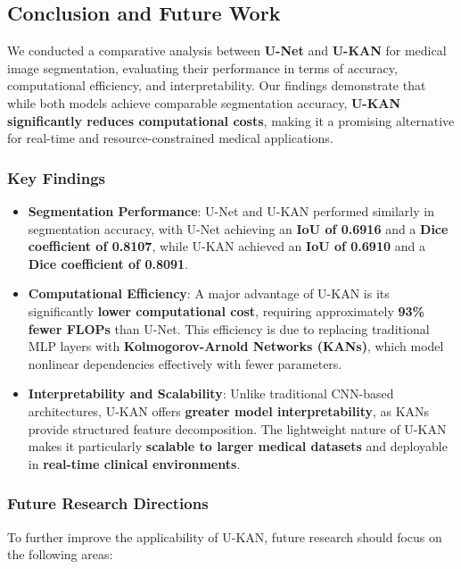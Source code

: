 \documentclass[conference]{IEEEtran}
\begin{document}
\subsection{Conclusion and Future Work}

We conducted a comparative analysis between \textbf{U-Net} and \textbf{U-KAN}
for medical image segmentation, evaluating their performance in terms of
accuracy, computational efficiency, and interpretability. Our findings
demonstrate that while both models achieve comparable segmentation accuracy,
\textbf{U-KAN significantly reduces computational costs}, making it a promising
alternative for real-time and resource-constrained medical applications.

\subsubsection{Key Findings}

\begin{itemize}
    \item \textbf{Segmentation Performance}: U-Net and U-KAN performed similarly in segmentation accuracy, with U-Net achieving an \textbf{IoU of 0.6916} and a \textbf{Dice coefficient of 0.8107}, while U-KAN achieved an \textbf{IoU of 0.6910} and a \textbf{Dice coefficient of 0.8091}.

    \item \textbf{Computational Efficiency}: A major advantage of U-KAN is its significantly \textbf{lower computational cost}, requiring approximately \textbf{93\% fewer FLOPs} than U-Net. This efficiency is due to replacing traditional MLP layers with \textbf{Kolmogorov-Arnold Networks (KANs)}, which model nonlinear dependencies effectively with fewer parameters.

    \item \textbf{Interpretability and Scalability}: Unlike traditional CNN-based architectures, U-KAN offers \textbf{greater model interpretability}, as KANs provide structured feature decomposition. The lightweight nature of U-KAN makes it particularly \textbf{scalable to larger medical datasets} and deployable in \textbf{real-time clinical environments}.
\end{itemize}

\subsubsection{Future Research Directions}

To further improve the applicability of U-KAN, future research should focus on
the following areas:
\end{document}
